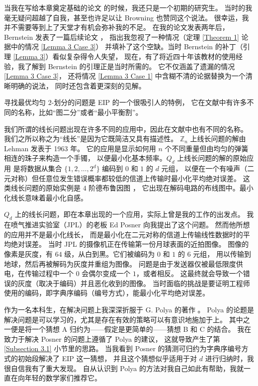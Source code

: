 \documentclass[12pt, a4paper]{article}
\begin{document}
当我在写给本章奠定基础的论文 \cite{Harper.1964} 的时候，我还只是一个初期的研究生。
当时的我毫无疑问超越了自我，甚至也许足以让 Browning 也赞同这个说法。
很幸运，我并不需要等到上了天堂才有机会弥补我的不足。
在我的论文发表两年后，Bernstein 发表了一篇后续论文 \cite{Bernstein.1967}，
指出我忽视了一种情况（定理 \ref{Theorem 1} 论据中的情况 \ref{Lemma 3 Case 3}）
并填补了这个空缺。当时 Bernstein 的补丁（引理 \ref{Lemma 3}）看似复杂得令人失望，
现在，有了将近四十年该教材的使用经验，我了解到 Bernstein 的引理正是当时所需的。
它不仅涵盖了遗漏的情况 \ref{Lemma 3 Case 3}，
还将情况 \ref{Lemma 3 Case 1} 中含糊不清的论据替换为一个清晰明确的说法，
同时还包含着更深刻的见解。

寻找最优均匀 $2$-划分的问题是 EIP 的一个很吸引人的特例，
它在文献中有许多不同的名称，比如“图二分”或者“最小平衡割”。

我们所谓的线长问题出现在许多不同的应用中，因此在文献中也有不同的名称。
我们之所以称之为“线长”是因为它既简洁又具有描述性。
$\mathbb{Z}_n$ 上线长问题的解由 Lehman \cite{Lehman.1963} 发表于 1963 年。
它的应用是显示如何用 $n$ 个不同重量但由均匀的弹簧相连的珠子来构造一个手镯，
以便最小化基本频率。$Q_d$ 上线长问题的解的原始应用 \cite{Harper.1964}
是将数据从集合 $\{1, 2, \dots, 2^d\}$ 编码到 $0$ 和 $1$ 的 $d$ 元组，
以便在一个有噪声（二元对称）但任意位发生错误概率都较低的信道上传输时最小化平均绝对误差。
这类线长问题的原始实例是 $4$ 阶德布鲁因图 \cite{Harper.1970}，
它出现在解码电路的布线图中。最小化线长意味着最小化自感。

$Q_d$ 上的线长问题，即在本章出现的一个应用，实际上曾是我的工作的出发点。
我在喷气推进实验室（JPL）的老板 Ed Posner 向我提出了这个问题。
然而他所想的应用并不是最小化线长，
而是最小化在二元对称的信道上传输线性数据时的平均绝对误差。
当时 JPL 的摄像机正在传输第一份月球表面的近拍图像。
图像的像素是灰度，有 $64$ 级，从白到黑。它们被编码为 $0$ 和 $1$ 的 $6$ 元组，
用以传输到地球，然后再被解码为灰度并重组为图像。
问题是由于发送器仅被最低限度供电，在传输过程中一个 $0$ 会偶尔变成一个 $1$，或者相反。
这最终就会导致一个错误的灰度（取决于编码）并且恶化收到的图像。
当时面临的挑战是要证明工程师使用的编码，即字典序编码（编号方式），能最小化平均绝对误差。

作为一名本科生，在解决问题上我深深折服于 G. Polya 的著作 \cite{Polya.1954}。
Polya 的论题是解决问题是可以学习的，尤其是存在有效的策略可以有意识地施加于上。
其中之一便是将一个猜想 A 归约为——假定是更简单的——猜想 B 和 C 的结合。
我在致力于解决 Posner 的问题上遵循了 Polya 的建议，
这就导致产生了第 \ref{Subsection 3.1} 小节里的思路。
当我看到 Posner 的猜测可归约为字典序编号方式的初始段解决了 EIP 这一猜想，
并且这个猜想似乎适用于对 $d$ 进行归纳时，我很自信我有了重大发现。
自从认识到 Polya 的方法对我自己如此有帮助，我就一直在向年轻的数学家们推荐它。
\end{document}
